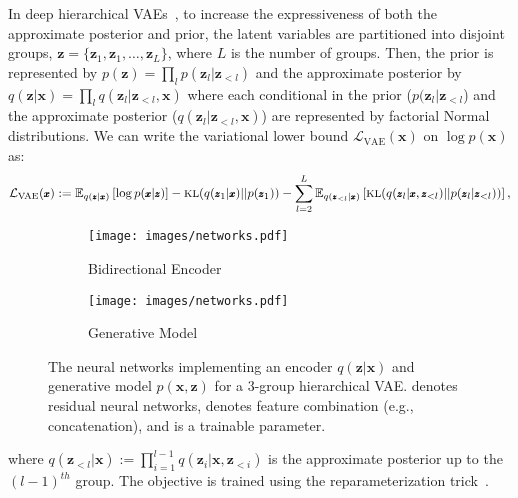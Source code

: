 \documentclass{article}
\newcommand{\x}{{\pmb{x}}}
\newcommand{\z}{{\pmb{z}}}
\newcommand{\KL}[2]{\text{KL}\!\left(#1 || #2\right)}
\renewcommand{\L}{{\mathcal{L}}}
\newcommand{\E}{{\mathbb{E}}}
\begin{document}
In deep hierarchical VAEs~\cite{gregor2015draw, ranganath16hierarchical, kingma2016improved, sonderby2016ladder, klushyn19hierarchicalprior}, to increase the expressiveness of both the approximate posterior and prior, the latent variables are partitioned into disjoint groups, $\z = \{ \z_1, \z_1, \dots, \z_L \}$, where $L$ is the number of groups. Then, the prior is represented by $p(\z) = \prod_l p(\z_l|\z_{<l})$ and the approximate posterior by $q(\z|\x) = \prod_l q(\z_l|\z_{<l}, \x)$ where each conditional in the prior ($p(\z_l|\z_{<l}$) and the approximate posterior ($q(\z_l|\z_{<l}, \x)$) are represented by factorial Normal distributions. We can write the variational lower bound $\L_{\text{VAE}}(\x)$ on $\log p(\x)$ as:
\begin{equation} \label{eq:hvae}
\footnotesize
    \L_{\text{VAE}}(\x) := \E_{q(\z|\x)}\left[ \log p(\x|\z) \right] - \KL{q(\z_1|\x)}{p(\z_1)} - \sum_{l=2}^L \E_{q(\z_{<l}|\x)} \left[ \KL{q(\z_l|\x, \z_{<l})}{p(\z_l|\z_{<l})} \right],
\end{equation}\begin{wrapfigure}{r}{6.0cm}
\vspace{-0.6cm}
\hspace{-0.2cm}
\begin{subfigure}[b]{.25\textwidth}
\centering
    \setlength{\belowcaptionskip}{0pt}
\texttt{[image: images/networks.pdf]}
    \caption{\small Bidirectional Encoder}
    \label{fig:encoder_net}
\end{subfigure}\begin{subfigure}[b]{.19\textwidth}
\centering
    \setlength{\belowcaptionskip}{0pt}
\texttt{[image: images/networks.pdf]}
    \caption{Generative Model}
    \label{fig:generative_net}
\end{subfigure}
\caption{The neural networks implementing an encoder $q(\z|\x)$ and generative model $p(\x, \z)$ for a 3-group hierarchical VAE. 
 denotes residual neural networks, \raisebox{-3pt}{\protect\tikz \protect\node [draw,scale=0.6,circle,thick]{+};} denotes feature combination (e.g., concatenation), and  is a trainable parameter.}
\label{fig:model}
\vspace{-0.6cm}
\end{wrapfigure}
where $q(\z_{<l}|\x) := \prod_{i=1}^{l-1} q(\z_i|\x, \z_{<i})$ is the approximate posterior up to the $(l-1)^{th}$ group. The objective is trained using the reparameterization trick~\cite{kingma2014vae, rezende2014stochastic}. 
\end{document}
